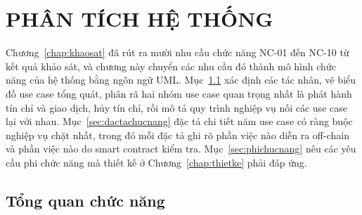 %
%

\chapter{PHÂN TÍCH HỆ THỐNG}
\label{chap:phantich}


Chương~\ref{chap:khaosat} đã rút ra mười nhu cầu chức năng NC-01 đến NC-10 từ kết quả khảo sát, và chương này chuyển các nhu cầu đó thành mô hình chức năng của hệ thống bằng ngôn ngữ UML. Mục~\ref{sec:tongquanchucnang} xác định các tác nhân, vẽ biểu đồ use case tổng quát, phân rã hai nhóm use case quan trọng nhất là phát hành tín chỉ và giao dịch, hủy tín chỉ, rồi mô tả quy trình nghiệp vụ nối các use case lại với nhau. Mục~\ref{sec:dactachucnang} đặc tả chi tiết năm use case có ràng buộc nghiệp vụ chặt nhất, trong đó mỗi đặc tả ghi rõ phần việc nào diễn ra off-chain và phần việc nào do smart contract kiểm tra. Mục~\ref{sec:phichucnang} nêu các yêu cầu phi chức năng mà thiết kế ở Chương~\ref{chap:thietke} phải đáp ứng.

\section{Tổng quan chức năng}
\label{sec:tongquanchucnang}

